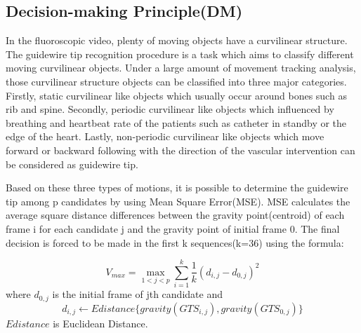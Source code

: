 \documentclass[journal]{IEEEtran}
\begin{document}
\subsection{Decision-making Principle(DM)}
In the fluoroscopic video, plenty of moving objects have a curvilinear structure. The guidewire tip recognition procedure is a task which aims to classify different moving curvilinear objects. Under a large amount of movement tracking analysis, those curvilinear structure objects can be classified into three major categories. Firstly, static curvilinear like objects which usually occur around bones such as rib and spine. Secondly, periodic curvilinear like objects which influenced by breathing and heartbeat rate of the patients such as catheter in standby or the edge of the heart. Lastly, non-periodic curvilinear like objects which move forward or backward following with the direction of the vascular intervention can be considered as guidewire tip. 

Based on these three types of motions, it is possible to determine the guidewire tip among p candidates by using Mean Square Error(MSE). MSE calculates the average square distance differences between the gravity point(centroid) of each frame i for each candidate j and the gravity point of initial frame 0. The final decision is forced to be made in the first k sequences(k=36) using the formula: 

$$ V_{max} = \max\limits_{1<j<p} {\sum_{i=1} ^k \frac{1}{k} (d_{i,j}-d_{0,j})^2} $$
where $d_{0,j}$ is the initial frame of jth candidate and 
$$ d_{i,j} \leftarrow Edistance\Big\{gravity(GTS_{i,j}),gravity(GTS_{0,j}) \Big\}$$
$Edistance$ is Euclidean Distance.
\end{document}

